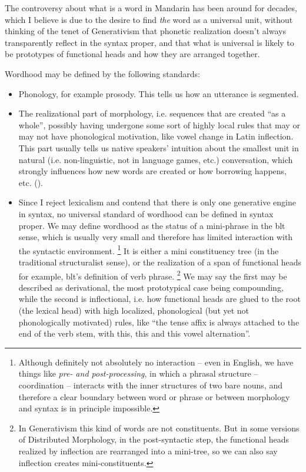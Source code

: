 \documentclass[UTF8, a4paper, oneside, scheme=plain, 12pt]{ctexrep}
\newcommand{\form}[1]{\emph{#1}}
\begin{document}
{The controversy about what is a word in Mandarin 
has been around for decades,
which I believe is due to the desire to 
find \emph{the} word as a universal unit,
without thinking of the tenet of Generativism 
that phonetic realization doesn't always 
transparently reflect in the syntax proper,
and that what is universal is likely to be 
prototypes of functional heads and how they are arranged together.

Wordhood may be defined by the following standards:
\begin{itemize}
    \item Phonology, for example prosody. This tells us how an utterance is segmented.
    \item The realizational part of morphology, 
    i.e. sequences that are created ``as a whole'', 
    possibly having undergone some sort of highly local rules 
    that may or may not have phonological motivation, 
    like vowel change in Latin inflection.
    This part usually tells us native speakers' intuition 
    about the smallest unit in natural (i.e. non-linguistic, not in language games, etc.) conversation,
    which strongly influences how new words are created 
    or how borrowing happens, etc. ().
    \item Since I reject lexicalism and contend that there is only one generative engine in syntax, 
    no universal standard of wordhood can be defined in syntax proper.
    We may define wordhood as the status of a mini-phrase in the \acs{blt} sense,
    which is usually very small and therefore has limited interaction with the syntactic environment.%
    \footnote{
        Although definitely not absolutely no interaction -- 
        even in English, we have things like \form{pre- and post-processing}, 
        in which a phrasal structure -- coordination -- interacts 
        with the inner structures of two bare nouns, 
        and therefore a clear boundary between word or phrase 
        or between morphology and syntax is in principle impossible.
    }
    It is either a mini constituency tree (in the traditional structuralist sense),
    or the realization of a span of functional heads 
    for example, \acs{blt}'s definition of verb phrase.%
    \footnote{
        In Generativism this kind of words are not constituents.
        But in some versions of Distributed Morphology, 
        in the post-syntactic step, 
        the functional heads realized by inflection are rearranged into a mini-tree, 
        so we can also say inflection creates mini-constituents.
    } 
    We may say the first may be described as derivational,
    the most prototypical case being compounding,
    while the second is inflectional,
    i.e. how functional heads are glued to the root (the lexical head) 
    with high localized, phonological (but yet not phonologically motivated) rules,
    like ``the tense affix is always attached to the end of the verb stem, 
    with this, this and this vowel alternation''.
\end{itemize}

}
\end{document}
